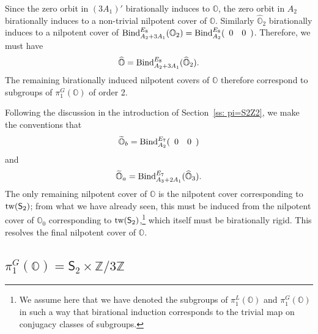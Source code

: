 \documentclass[11pt]{amsart}
\renewcommand{\O}{{\mathbb O}}
\newcommand{\bZ}{{\mathbb Z}}
\newcommand{\Sym}{{\mathsf{S}}}
\newcommand{\tw}{{{\mbox{\rm tw}}}}
\newcommand{\BInd}{{{\mbox{\rm Bind}}}}
\newcommand{\covO}{\widetilde{\O}}
\newcommand{\hatO}{\widehat{\O}}
\numberwithin{equation}{section}
\begin{document}
	Since the zero orbit in $(3 A_1)'$ birationally induces to $\O$, the zero orbit in $A_2$ birationally induces to a non-trivial nilpotent cover of $\O$. Similarly $\hatO_2$ birationally induces to a nilpotent cover of $\BInd_{A_2 + 3 A_1}^{E_8}(\O_2)=\BInd_{A_2}^{E_8}(\begin{array}{c c}
		0 & 0 \\
	\end{array})$. Therefore, we must have $$\hatO=\BInd_{A_2 + 3 A_1}^{E_8}(\hatO_2).$$ The remaining birationally induced nilpotent covers of $\O$ therefore correspond to subgroups of $\pi_1^G(\O)$ of order 2.
	
	Following the discussion in the introduction of Section~\ref{ss: pi=S2Z2}, we make the conventions that $$\covO_b=\BInd_{A_2}^{E_7}(\begin{array}{c c}
		0 & 0 \\
	\end{array})$$ 
	and $$\covO_a=\BInd_{A_3 + 2 A_1}^{E_7}(\hatO_3).$$ The only remaining nilpotent cover of $\O$ is the nilpotent cover corresponding to $\tw(\Sym_2)$; from what we have already seen, this must be induced from the nilpotent cover of $\O_0$ corresponding to $\tw(\Sym_2)$,\footnote{We assume here that we have denoted the subgroups of $\pi_1^L(\O)$ and $\pi_1^G(\O)$ in such a way that birational induction corresponds to the trivial map on conjugacy classes of subgroups.} which itself must be birationally rigid. This resolves the final nilpotent cover of $\O$.
	
	
	\subsection{\texorpdfstring{$\pi_1^G(\O)=\Sym_2\times \bZ/3\bZ$}{pi=S2Z3}}\label{ss: pi=S2Z3}
	
\end{document}
